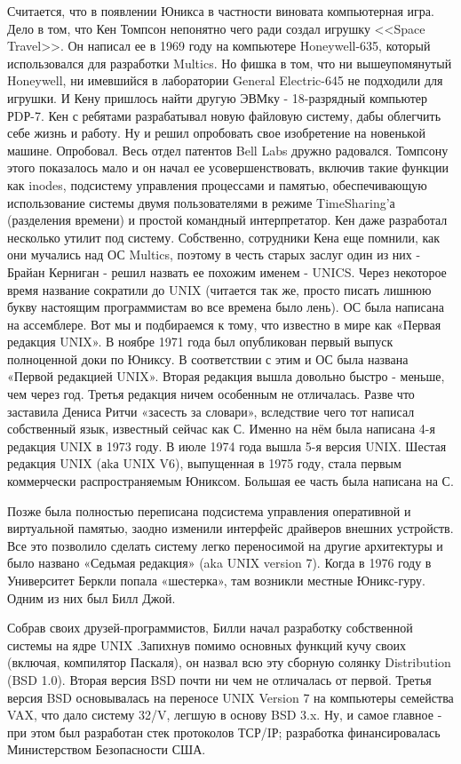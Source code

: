 Считается, что в появлении Юникса в частности виновата компьютерная игра. Дело в том, что Кен Томпсон непонятно чего ради создал игрушку <<Space Travel>>. Он написал ее в 1969 году на компьютере Honeywell-635, который использовался для разработки Multics. Но фишка в том, что ни вышеупомянутый Honeywell, ни имевшийся в лаборатории General Electric-645 не подходили для игрушки. И Кену пришлось найти другую ЭВМку - 18-разрядный компьютер РDР-7. Кен с ребятами разрабатывал новую файловую систему, дабы облегчить себе жизнь и работу. Ну и решил опробовать свое изобретение на новенькой машине. Опробовал. Весь отдел патентов Bell Labs дружно радовался. Томпсону этого показалось мало и он начал ее усовершенствовать, включив такие функции как inodes, подсистему управления процессами и памятью, обеспечивающую использование системы двумя пользователями в режиме TimeSharing'а (разделения времени) и простой командный интерпретатор. Кен даже разработал несколько утилит под систему. Собственно, сотрудники Кена еще помнили, как они мучались над ОС Multics, поэтому в честь старых заслуг один из них - Брайан Керниган - решил назвать ее похожим именем - UNICS. Через некоторое время название сократили до UNIX (читается так же, просто писать лишнюю букву настоящим программистам во все времена было лень). ОС была написана на ассемблере. Вот мы и подбираемся к тому, что известно в мире как «Первая редакция UNIX». В ноябре 1971 года был опубликован первый выпуск полноценной доки по Юниксу. В соответствии с этим и ОС была названа «Первой редакцией UNIX». Вторая редакция вышла довольно быстро - меньше, чем через год. Третья редакция ничем особенным не отличалась. Разве что заставила Дениса Ритчи «засесть за словари», вследствие чего тот написал собственный язык, известный сейчас как С. Именно на нём была написана 4-я редакция UNIX в 1973 году. В июле 1974 года вышла 5-я версия UNIX. Шестая редакция UNIX (аkа UNIX V6), выпущенная в 1975 году, стала первым коммерчески распространяемым Юниксом. Большая ее часть была написана на С.

Позже была полностью переписана подсистема управления оперативной и виртуальной памятью, заодно изменили интерфейс драйверов внешних устройств. Все это позволило сделать систему легко переносимой на другие архитектуры и было названо «Седьмая редакция» (aka UNIX version 7). Когда в 1976 году в Университет Беркли попала «шестерка», там возникли местные Юникс-гуру. Одним из них был Билл Джой.

Собрав своих друзей-программистов, Билли начал разработку собственной системы на ядре UNIX .Запихнув помимо основных функций кучу своих (включая, компилятор Паскаля), он назвал всю эту сборную солянку Distribution (BSD 1.0). Вторая версия BSD почти ни чем не отличалась от первой. Третья версия BSD основывалась на переносе UNIX Version 7 на компьютеры семейства VAX, что дало систему 32/V, легшую в основу BSD 3.x. Ну, и самое главное - при этом был разработан стек протоколов ТСР/IР; разработка финансировалась Министерством Безопасности США.

